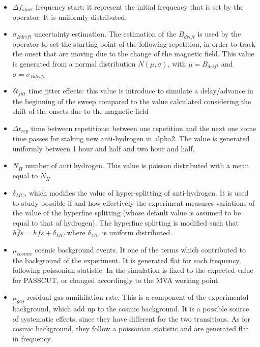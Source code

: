 \documentclass[11pt,a4paper,oneside]{article}
\begin{document}
\begin{itemize}
\item $\Delta f_{start}$ frequency start: it represent the initial frequency that is set by the operator. It is uniformly distributed.   
\item $\sigma_{Bdrift}$ uncertainty estimation. The estimation of the $B_{drift}$ is used by the operator to set the starting point of the following repetition, in order to track the onset that are moving due to the change of the magnetic field. This value is generated from a normal distribution $N(\mu, \sigma)$, with $\mu = B_{drift}$ and $\sigma = \sigma_{Bdrift}$
\item $\delta t_{jitt}$ time jitter effects: this value is introduce to simulate a delay/advance in the beginning of the sweep compared to the value calculated considering the shift of the onsets due to the magnetic field
\item $\Delta t_{rep}$ time between repetitions: between one repetition and the next one some time passes for staking new anti-hydrogen in alpha2. The value is generated uniformly between 1 hour and half and two hour and half.
\item $N_{\overline{H}}$ number of anti hydrogen. This value is poisson distributed with a mean equal to $N_{\overline{H}}$
\item $\delta_{MC}$, which modifies the value of hyper-splitting of anti-hydrogen. It is used to study possible if and how effectively the experiment measures variations of the value of the hyperfine splitting (whose default value is assumed to be equal to that of hydrogen). The hyperfine splitting is modified such that $\overline{hfs} = hfs + \delta_{MC} $ where $\delta_{MC}$ is uniform distributed.
\item $\mu_{cosmic}$ cosmic background events. It one of the terms which contributed to the background of the experiment. It is generated flat for each frequency, following poissonian statistic. In the simulation is fixed to the expected value for PASSCUT, or changed accordingly to the MVA working point.
\item $\mu_{gas}$ residual gas annihilation rate. This is a component of the experimental background, which add up to the cosmic background. It is a possible source of systematic effects, since they have different for the two transitions. As for cosmic background, they follow a poissonian statistic and are generated flat in frequency.
\end{itemize}
\end{document}
